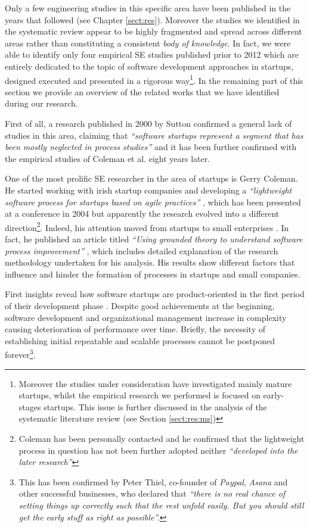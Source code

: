 \documentclass[final,5p,times,twocolumn]{elsarticle}
\begin{document}
Only a few engineering studies in this specific area have been published in the years that followed (see Chapter \ref{sect:res}). Moreover the studies we identified in the systematic review appear to be highly fragmented and spread across different areas rather than constituting a consistent \textit{body of knowledge}. In fact, we were able to identify only four empirical SE studies published prior to 2012 which are entirely dedicated to the topic of software development approaches in startups, designed executed and presented in a rigorous way\footnote{Moreover the studies under consideration \cite{Coleman2008,Coleman2008a,Coleman2007,Kajko-Mattsson2008} have investigated mainly mature startups, whilst the empirical research we performed is focused on early-stages startups. This issue is further discussed in the analysis of the systematic literature review (see Section \ref{sect:res:ms})}. In the remaining part of this section we provide an overview of the related works that we have identified during our research.

First of all, a research published in 2000 by Sutton \cite{Sutton2000} confirmed a general lack of  studies in this area, claiming that \textit{``software startups represent a segment that has been mostly neglected in process studies''} and it has been further confirmed with the empirical studies of Coleman et al. \cite{Coleman2008,Coleman2008a,Coleman2007} eight years later.

One of the most prolific SE researcher in the area of startups is Gerry Coleman. He started working with irish startup companies and developing a  \textit{``lightweight software process for startups based on agile practices''} \cite{Coleman2004}, which has been presented at a conference in 2004 \cite{Coleman} but apparently the research evolved into a different direction\footnote{Coleman has been personally contacted and he confirmed that the lightweight process in question has not been further adopted neither \textit{``developed into the later research''}}. Indeed, his attention moved from startups to small enterprises \cite{Coleman2005}. In fact, he published an article titled \textit{``Using grounded theory to understand software process improvement''} \cite{Coleman2007}, which includes detailed explanation of the research methodology undertaken for his analysis. His results show different factors that influence and hinder the formation of processes in startups and small companies.

First insights reveal how software startups are product-oriented in the first period of their development phase \cite{Heitlager2007}. Despite good achievements at the beginning, software development and organizational management increase in complexity \cite{1456074,Banker1998} causing  deterioration of performance over time. Briefly, the necessity of establishing initial repeatable and scalable processes cannot be postponed forever\footnote{This has been confirmed by Peter Thiel, co-founder of \textit{Paypal}, \textit{Asana} and other successful businesses, who declared that \textit{``there is no real chance of setting things up correctly such that the rest unfold easily. But you should still get the early stuff as right as possible''\cite{ThielCS183}.} }.
\end{document}
